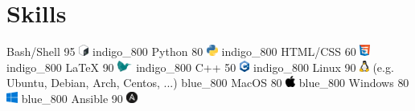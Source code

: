 \documentclass[
  paper=a4,
  fontsize=10pt
]{resume}
\begin{document}
{  \section[\nerdfont]{Skills}
      \skill%
        {Bash/Shell}%
        {95}%
        {\includegraphics[height=1em]{skill/bash.png}}%
        {}%
        {indigo_800}
      \skill%
        {Python}%
        {80}%
        {\includegraphics[height=1em]{skill/python.png}}%
        {}%
        {indigo_800}
      \skill%
        {HTML/CSS}%
        {60}%
        {\includegraphics[height=1em]{skill/html_css.png}}%
        {}%
        {indigo_800}
      \skill%
        {LaTeX}%
        {90}%
        {\includegraphics[height=1em]{skill/latex.png}}%
        {}%
        {indigo_800}
      \skill%
        {C++}%
        {50}%
        {\includegraphics[height=1em]{skill/cpp.png}}%
        {}%
        {indigo_800}
      \skill%
        {Linux}%
        {90}%
        {\includegraphics[height=1em]{skill/linux.png}}%
        {(e.g. Ubuntu, Debian, Arch, Centos, ...)}%
        {blue_800}
      \skill%
        {MacOS}%
        {80}%
        {\includegraphics[height=1em]{skill/apple.png}}%
        {}%
        {blue_800}
      \skill%
        {Windows}%
        {80}%
        {\includegraphics[height=1em]{skill/windows.png}}%
        {}%
        {blue_800}
      \skill%
        {Ansible}%
        {90}%
        {\includegraphics[height=1em]{skill/ansible.png}}%
        {}%
}
\end{document}
